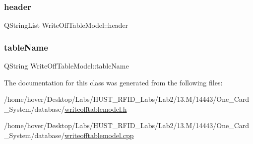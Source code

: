 \subsubsection{\texorpdfstring{header}{header}}
{\footnotesize\ttfamily Q\+String\+List Write\+Off\+Table\+Model\+::header\hspace{0.3cm}{\ttfamily [private]}}

\mbox{\label{class_write_off_table_model_a07073c77e57b3a366ad2280e838d05ed}} 
\subsubsection{\texorpdfstring{tableName}{tableName}}
{\footnotesize\ttfamily Q\+String Write\+Off\+Table\+Model\+::table\+Name\hspace{0.3cm}{\ttfamily [private]}}



The documentation for this class was generated from the following files\+:\begin{DoxyCompactItemize}
\item 
/home/hover/\+Desktop/\+Labs/\+H\+U\+S\+T\+\_\+\+R\+F\+I\+D\+\_\+\+Labs/\+Lab2/13.\+M/14443/\+One\+\_\+\+Card\+\_\+\+System/database/\mbox{\hyperlink{writeofftablemodel_8h}{writeofftablemodel.\+h}}\item 
/home/hover/\+Desktop/\+Labs/\+H\+U\+S\+T\+\_\+\+R\+F\+I\+D\+\_\+\+Labs/\+Lab2/13.\+M/14443/\+One\+\_\+\+Card\+\_\+\+System/database/\mbox{\hyperlink{writeofftablemodel_8cpp}{writeofftablemodel.\+cpp}}\end{DoxyCompactItemize}

